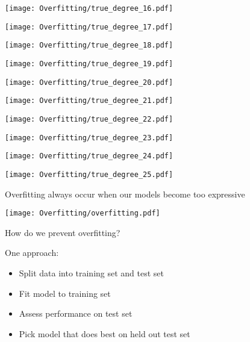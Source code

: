 \documentclass[xcolor=pdftex,dvipsnames,table]{beamer}
\begin{document}
\frame
{
	\begin{center}
		\texttt{[image: Overfitting/true\_degree\_16.pdf]}
	\end{center}
}
\frame
{
	\begin{center}
		\texttt{[image: Overfitting/true\_degree\_17.pdf]}
	\end{center}
}
\frame
{
	\begin{center}
		\texttt{[image: Overfitting/true\_degree\_18.pdf]}
	\end{center}
}
\frame
{
	\begin{center}
		\texttt{[image: Overfitting/true\_degree\_19.pdf]}
	\end{center}
}
\frame
{
	\begin{center}
		\texttt{[image: Overfitting/true\_degree\_20.pdf]}
	\end{center}
}
\frame
{
	\begin{center}
		\texttt{[image: Overfitting/true\_degree\_21.pdf]}
	\end{center}
}
\frame
{
	\begin{center}
		\texttt{[image: Overfitting/true\_degree\_22.pdf]}
	\end{center}
}
\frame
{
	\begin{center}
		\texttt{[image: Overfitting/true\_degree\_23.pdf]}
	\end{center}
}
\frame
{
	\begin{center}
		\texttt{[image: Overfitting/true\_degree\_24.pdf]}
	\end{center}
}
\frame
{
	\begin{center}
		\texttt{[image: Overfitting/true\_degree\_25.pdf]}
	\end{center}
}

\frame
{
	Overfitting always occur when our models become too expressive
}

\frame
{
	\begin{center}
		\texttt{[image: Overfitting/overfitting.pdf]}
	\end{center}
}

\frame
{
	How do we prevent overfitting?
}

\frame
{
	One approach:
	\begin{itemize}
		\item{Split data into training set and test set}
		\item{Fit model to training set}
		\item{Assess performance on test set}
		\item{Pick model that does best on held out test set}
	\end{itemize}
}
\end{document}
